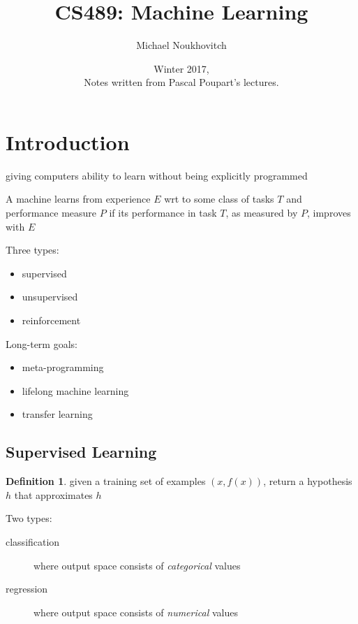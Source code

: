 \documentclass[]{article}
\theoremstyle{definition}
\newtheorem*{defn}{Definition}
\begin{document}
\let\ref\Cref

\title{\bf{CS489: Machine Learning}}
\date{Winter 2017, \\ \center Notes written from Pascal Poupart's lectures.}
\author{Michael Noukhovitch}

\maketitle
\newpage
\tableofcontents
\newpage

\section{Introduction}
\begin{description} 
    \item[machine learning] giving computers ability to learn without being explicitly programmed
    \item A machine learns from experience $E$ wrt to some class of tasks $T$ and performance measure $P$ if its performance in task $T$, as measured by $P$, improves with $E$
\end{description}

Three types:
\begin{itemize}
    \item supervised
    \item unsupervised
    \item reinforcement
\end{itemize}

Long-term goals:
\begin{itemize}
    \item meta-programming
    \item lifelong machine learning
    \item transfer learning
\end{itemize}

\subsection{Supervised Learning}
\begin{defn}
    given a training set of examples $(x,f(x))$, return a hypothesis $h$ that approximates $h$
\end{defn}
Two types:
\begin{description}
    \item[classification] where output space consists of \textit{categorical} values
    \item[regression] where output space consists of \textit{numerical} values
\end{description}
\end{document}
